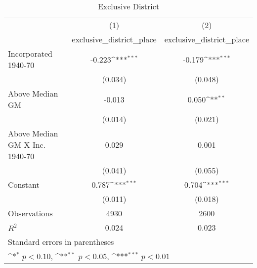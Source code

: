 \begin{table}[htbp]\centering
\def\sym#1{\ifmmode^{#1}\else\(^{#1}\)\fi}
\caption{Exclusive District}
\begin{tabular}{l*{2}{c}}
\hline\hline
                    &\multicolumn{1}{c}{(1)}&\multicolumn{1}{c}{(2)}\\
                    &\multicolumn{1}{c}{exclusive\_district\_place}&\multicolumn{1}{c}{exclusive\_district\_place}\\
\hline
Incorporated 1940-70&      -0.223\sym{***}&      -0.179\sym{***}\\
                    &     (0.034)         &     (0.048)         \\
[1em]
Above Median GM     &      -0.013         &       0.050\sym{**} \\
                    &     (0.014)         &     (0.021)         \\
[1em]
Above Median GM X Inc. 1940-70&       0.029         &       0.001         \\
                    &     (0.041)         &     (0.055)         \\
[1em]
Constant            &       0.787\sym{***}&       0.704\sym{***}\\
                    &     (0.011)         &     (0.018)         \\
\hline
Observations        &        4930         &        2600         \\
\(R^{2}\)           &       0.024         &       0.023         \\
\hline\hline
\multicolumn{3}{l}{\footnotesize Standard errors in parentheses}\\
\multicolumn{3}{l}{\footnotesize \sym{*} \(p<0.10\), \sym{**} \(p<0.05\), \sym{***} \(p<0.01\)}\\
\end{tabular}
\end{table}
